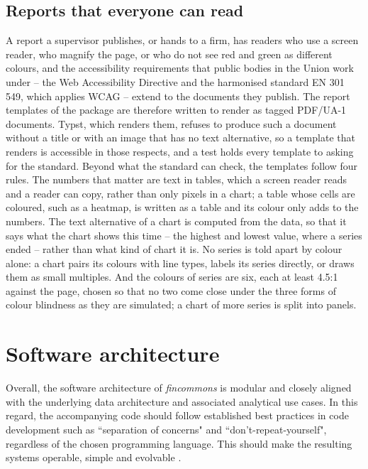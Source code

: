\documentclass[a4paper, 11pt]{report}
\begin{document}
\subsection{Reports that everyone can read}

A report a supervisor publishes, or hands to a firm, has readers who use a screen reader, who magnify the page, or who do not see red and green as different colours, and the accessibility requirements that public bodies in the Union work under -- the Web Accessibility Directive and the harmonised standard EN 301\,549, which applies WCAG -- extend to the documents they publish. The report templates of the package are therefore written to render as tagged PDF/UA-1 documents. Typst, which renders them, refuses to produce such a document without a title or with an image that has no text alternative, so a template that renders is accessible in those respects, and a test holds every template to asking for the standard. Beyond what the standard can check, the templates follow four rules. The numbers that matter are text in tables, which a screen reader reads and a reader can copy, rather than only pixels in a chart; a table whose cells are coloured, such as a heatmap, is written as a table and its colour only adds to the numbers. The text alternative of a chart is computed from the data, so that it says what the chart shows this time -- the highest and lowest value, where a series ended -- rather than what kind of chart it is. No series is told apart by colour alone: a chart pairs its colours with line types, labels its series directly, or draws them as small multiples. And the colours of series are six, each at least 4.5:1 against the page, chosen so that no two come close under the three forms of colour blindness as they are simulated; a chart of more series is split into panels.


\section{Software architecture\label{sec:intro-software}}




Overall, the software architecture of \emph{fincommons} is modular and closely aligned with the underlying data architecture and associated analytical use cases. In this regard, the accompanying code should follow established best practices in code development such as ``separation of concerns" and ``don't-repeat-yourself", regardless of the chosen programming language. This should make the resulting systems operable, simple and evolvable \parencite[Chapter~1]{Kleppmann.2017}.
\end{document}
